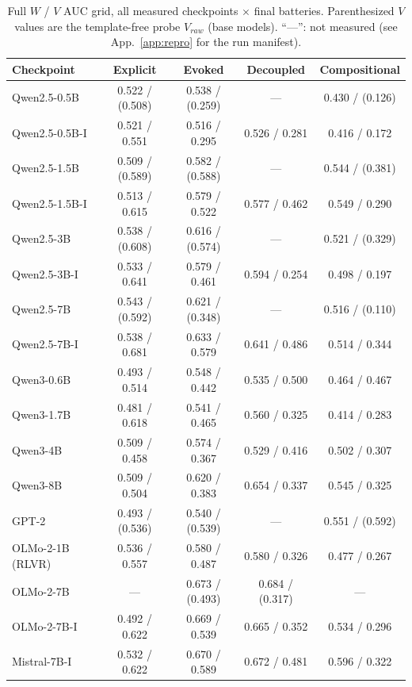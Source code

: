 \begin{table}[h]
\centering
\caption{Full $W$ / $V$ AUC grid, all measured checkpoints $\times$ final
batteries. Parenthesized $V$ values are the template-free probe $V_{raw}$ (base
models). ``---'': not measured (see App.~\ref{app:repro} for the run manifest).}
\label{tab:appA1}
\scriptsize
\begin{tabular}{lcccc}
\toprule
Checkpoint & Explicit & Evoked & Decoupled & Compositional \\
\midrule
Qwen2.5-0.5B & 0.522 / (0.508) & 0.538 / (0.259) & --- & 0.430 / (0.126) \\
Qwen2.5-0.5B-I & 0.521 / 0.551 & 0.516 / 0.295 & 0.526 / 0.281 & 0.416 / 0.172 \\
Qwen2.5-1.5B & 0.509 / (0.589) & 0.582 / (0.588) & --- & 0.544 / (0.381) \\
Qwen2.5-1.5B-I & 0.513 / 0.615 & 0.579 / 0.522 & 0.577 / 0.462 & 0.549 / 0.290 \\
Qwen2.5-3B & 0.538 / (0.608) & 0.616 / (0.574) & --- & 0.521 / (0.329) \\
Qwen2.5-3B-I & 0.533 / 0.641 & 0.579 / 0.461 & 0.594 / 0.254 & 0.498 / 0.197 \\
Qwen2.5-7B & 0.543 / (0.592) & 0.621 / (0.348) & --- & 0.516 / (0.110) \\
Qwen2.5-7B-I & 0.538 / 0.681 & 0.633 / 0.579 & 0.641 / 0.486 & 0.514 / 0.344 \\
Qwen3-0.6B & 0.493 / 0.514 & 0.548 / 0.442 & 0.535 / 0.500 & 0.464 / 0.467 \\
Qwen3-1.7B & 0.481 / 0.618 & 0.541 / 0.465 & 0.560 / 0.325 & 0.414 / 0.283 \\
Qwen3-4B & 0.509 / 0.458 & 0.574 / 0.367 & 0.529 / 0.416 & 0.502 / 0.307 \\
Qwen3-8B & 0.509 / 0.504 & 0.620 / 0.383 & 0.654 / 0.337 & 0.545 / 0.325 \\
GPT-2 & 0.493 / (0.536) & 0.540 / (0.539) & --- & 0.551 / (0.592) \\
OLMo-2-1B (RLVR) & 0.536 / 0.557 & 0.580 / 0.487 & 0.580 / 0.326 & 0.477 / 0.267 \\
OLMo-2-7B & --- & 0.673 / (0.493) & 0.684 / (0.317) & --- \\
OLMo-2-7B-I & 0.492 / 0.622 & 0.669 / 0.539 & 0.665 / 0.352 & 0.534 / 0.296 \\
Mistral-7B-I & 0.532 / 0.622 & 0.670 / 0.589 & 0.672 / 0.481 & 0.596 / 0.322 \\
\bottomrule
\end{tabular}
\end{table}
